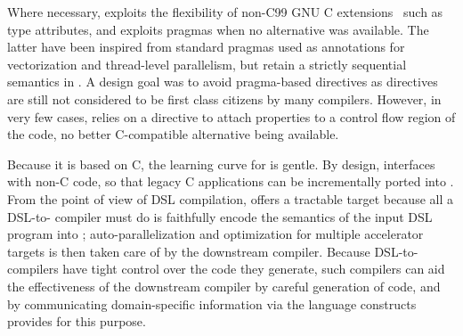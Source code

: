 Where necessary, \pencil exploits the flexibility of non-C99 GNU
C extensions~\cite{gccguide} such as type attributes, and exploits
pragmas when no alternative was available.
The latter have been inspired from standard pragmas used as annotations
for vectorization and thread-level parallelism, but retain a strictly
sequential semantics in \pencil.
A design goal was to avoid pragma-based directives as directives are still
not considered to be first class citizens by many compilers.
However, in very few cases, \pencil relies on a directive to attach
properties to a control flow region of the code, no better C-compatible
alternative being available.

Because it is based on C, the learning curve for \pencil is gentle.
By design, \pencil interfaces with non-\pencil C code, so that legacy C 
applications can be
incrementally ported into \pencil.  From the point of view of DSL
compilation, \pencil offers a tractable target because all a DSL-to-\pencil
compiler must do is faithfully encode the semantics of the input DSL program
into \pencil; auto-parallelization and optimization for multiple accelerator
targets is then taken care of by the downstream compiler.
Because DSL-to-\pencil compilers have tight control over the code they
generate, such compilers can aid the effectiveness of the downstream
\pencil compiler by careful generation of code, and by communicating
domain-specific information via the language constructs \pencil provides
for this purpose.


